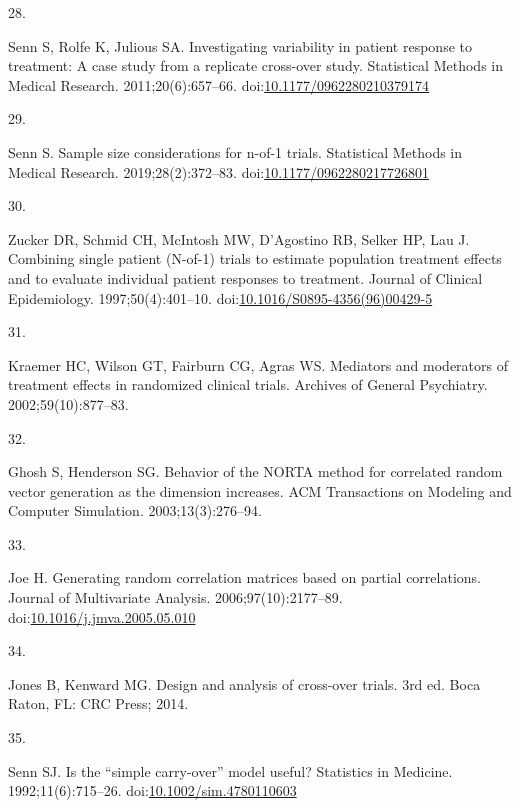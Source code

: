 \documentclass[
  11pt,
]{article}
\newlength{\cslhangindent}
\newlength{\csllabelwidth}
\newenvironment{CSLReferences}[2] %
 {\begin{list}{}{%
  \setlength{\itemindent}{0pt}
  \setlength{\leftmargin}{0pt}
  \setlength{\parsep}{0pt}
  \ifodd #1
   \setlength{\leftmargin}{\cslhangindent}
   \setlength{\itemindent}{-1\cslhangindent}
  \fi
  \setlength{\itemsep}{#2\baselineskip}}}
 {\end{list}}
\newcommand{\CSLLeftMargin}[1]{\parbox[t]{\csllabelwidth}{\strut#1\strut}}
\newcommand{\CSLRightInline}[1]{\parbox[t]{\linewidth - \csllabelwidth}{\strut#1\strut}}
\begin{document}
\begin{CSLReferences}{0}{1}
\CSLLeftMargin{28. }%
\CSLRightInline{Senn S, Rolfe K, Julious SA. Investigating variability in patient response to treatment: A case study from a replicate cross-over study. Statistical Methods in Medical Research. 2011;20(6):657--66. doi:\href{https://doi.org/10.1177/0962280210379174}{10.1177/0962280210379174}}

\CSLLeftMargin{29. }%
\CSLRightInline{Senn S. Sample size considerations for n-of-1 trials. Statistical Methods in Medical Research. 2019;28(2):372--83. doi:\href{https://doi.org/10.1177/0962280217726801}{10.1177/0962280217726801}}

\CSLLeftMargin{30. }%
\CSLRightInline{Zucker DR, Schmid CH, McIntosh MW, D'Agostino RB, Selker HP, Lau J. Combining single patient ({N}-of-1) trials to estimate population treatment effects and to evaluate individual patient responses to treatment. Journal of Clinical Epidemiology. 1997;50(4):401--10. doi:\href{https://doi.org/10.1016/S0895-4356(96)00429-5}{10.1016/S0895-4356(96)00429-5}}

\CSLLeftMargin{31. }%
\CSLRightInline{Kraemer HC, Wilson GT, Fairburn CG, Agras WS. Mediators and moderators of treatment effects in randomized clinical trials. Archives of General Psychiatry. 2002;59(10):877--83.}

\CSLLeftMargin{32. }%
\CSLRightInline{Ghosh S, Henderson SG. Behavior of the {NORTA} method for correlated random vector generation as the dimension increases. ACM Transactions on Modeling and Computer Simulation. 2003;13(3):276--94.}

\CSLLeftMargin{33. }%
\CSLRightInline{Joe H. Generating random correlation matrices based on partial correlations. Journal of Multivariate Analysis. 2006;97(10):2177--89. doi:\href{https://doi.org/10.1016/j.jmva.2005.05.010}{10.1016/j.jmva.2005.05.010}}

\CSLLeftMargin{34. }%
\CSLRightInline{Jones B, Kenward MG. Design and analysis of cross-over trials. 3rd ed. Boca Raton, FL: CRC Press; 2014.}

\CSLLeftMargin{35. }%
\CSLRightInline{Senn SJ. Is the {``simple carry-over''} model useful? Statistics in Medicine. 1992;11(6):715--26. doi:\href{https://doi.org/10.1002/sim.4780110603}{10.1002/sim.4780110603}}


\end{CSLReferences}
\end{document}
